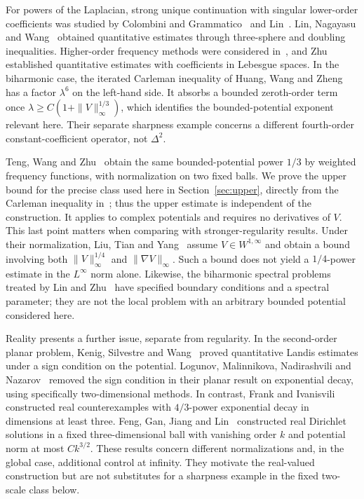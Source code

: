 \documentclass[11pt,twoside,leqno]{article}
\numberwithin{equation}{section}
\theoremstyle{definition}
\theoremstyle{remark}
\begin{document}
For powers of the Laplacian, strong unique continuation with singular
lower-order coefficients was studied by Colombini and
Grammatico~\cite{CG} and Lin~\cite{Lin07}. Lin, Nagayasu and
Wang~\cite{LNW} obtained quantitative estimates through three-sphere
and doubling inequalities. Higher-order frequency methods were
considered in~\cite{Zhu16}, and Zhu~\cite{Zhu} established
quantitative estimates with coefficients in Lebesgue spaces. In the
biharmonic case, the iterated Carleman inequality of Huang, Wang and
Zheng~\cite[Lemma~2.1]{HWZ} has a factor $\lambda^6$ on the
left-hand side. It absorbs a bounded zeroth-order term once
$\lambda\ge C(1+\|V\|_\infty^{1/3})$, which identifies the
bounded-potential exponent relevant here. Their separate sharpness
example concerns a different fourth-order constant-coefficient
operator, not $\Delta^2$.

Teng, Wang and Zhu~\cite[Theorem~2]{TWZ} obtain the same
bounded-potential power $1/3$ by weighted frequency functions, with
normalization on two fixed balls. We prove the upper bound for the
precise class used here in Section~\ref{sec:upper}, directly from
the Carleman inequality in~\cite{HWZ}; thus the upper estimate is
independent of the construction. It applies to complex potentials and
requires no derivatives of $V$. This last point matters when comparing
with stronger-regularity results. Under their normalization, Liu, Tian
and Yang~\cite[Theorem~1.1]{LTY} assume $V\in W^{1,\infty}$
and obtain a bound involving both $\|V\|_\infty^{1/4}$ and
$\|\nabla V\|_\infty$. Such a bound does not yield a
$1/4$-power estimate in the $L^\infty$ norm alone. Likewise, the
biharmonic spectral problems treated by Lin and Zhu~\cite{LZ} have
specified boundary conditions and a spectral parameter; they are not
the local problem with an arbitrary bounded potential considered here.

Reality presents a further issue, separate from regularity. In the
second-order planar problem, Kenig, Silvestre and Wang~\cite{KSW}
proved quantitative Landis estimates under a sign condition on the
potential. Logunov, Malinnikova, Nadirashvili and Nazarov~\cite{LMNN}
removed the sign condition in their planar result on exponential decay,
using specifically two-dimensional methods. In contrast, Frank and
Ivanisvili~\cite{FI} constructed real counterexamples with
$4/3$-power exponential decay in dimensions at least three. Feng, Gan,
Jiang and Lin~\cite[Theorem~1.1]{FGJL} constructed real Dirichlet
solutions in a fixed three-dimensional ball with vanishing order $k$
and potential norm at most $Ck^{3/2}$. These results concern different
normalizations and, in the global case, additional control at infinity.
They motivate the real-valued construction but are not substitutes for
a sharpness example in the fixed two-scale class below.
\end{document}
